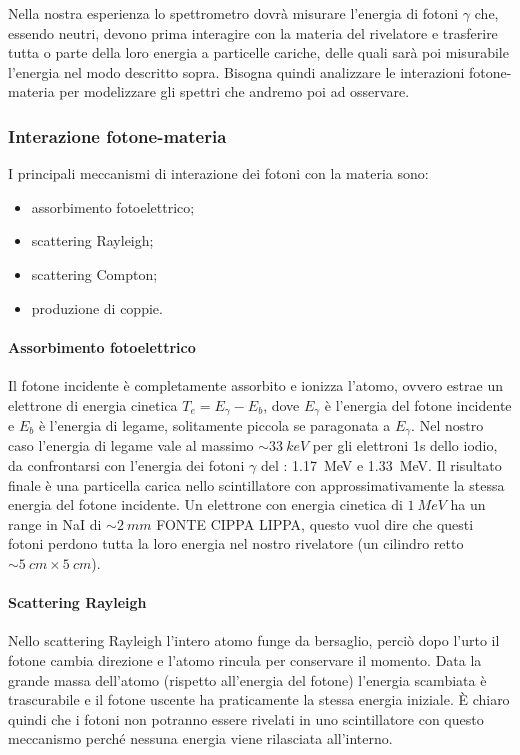 Nella nostra esperienza lo spettrometro dovrà misurare l'energia di fotoni $\gamma$ che, essendo neutri, devono prima interagire con la materia del rivelatore e trasferire tutta o parte della loro energia a particelle cariche, delle quali sarà poi misurabile l'energia nel modo descritto sopra. Bisogna quindi analizzare le interazioni fotone-materia per modelizzare gli spettri che andremo poi ad osservare.

\subsubsection{Interazione fotone-materia}
I principali meccanismi di interazione dei fotoni con la materia sono:
\begin{itemize}
	\item assorbimento fotoelettrico;
	\item scattering Rayleigh;
	\item scattering Compton;
	\item produzione di coppie.
\end{itemize}
  
 \paragraph{Assorbimento fotoelettrico}
 Il fotone incidente è completamente assorbito e ionizza l'atomo, ovvero estrae un elettrone di energia cinetica $T_e = E_{\gamma} - E_b$, dove $E_{\gamma}$ è l'energia del fotone incidente e $E_b$ è l'energia di legame, solitamente piccola se paragonata a $E_{\gamma}$. Nel nostro caso l'energia di legame vale al massimo $\sim \SI{33}{keV}$ per gli elettroni 1s dello iodio, da confrontarsi con l'energia dei fotoni $\gamma$ del \co\;: \SI{1.17}{MeV} e \SI{1.33}{MeV}. Il risultato finale è una particella carica nello scintillatore con approssimativamente la stessa energia del fotone incidente.
 Un elettrone con energia cinetica di $\SI{1}{MeV}$ ha un range in NaI di $\sim \SI{2}{mm}$ FONTE CIPPA LIPPA, questo vuol dire che questi fotoni perdono tutta la loro energia nel nostro rivelatore (un cilindro retto $\sim \SI{5}{cm} \times \SI{5}{cm}$). 

 \paragraph{Scattering Rayleigh}
 Nello scattering Rayleigh l'intero atomo funge da bersaglio, perciò dopo l'urto il fotone cambia direzione e l'atomo rincula per conservare il momento. Data la grande massa dell'atomo (rispetto all'energia del fotone) l'energia scambiata è trascurabile e il fotone uscente ha praticamente la stessa energia iniziale. \`E chiaro quindi che i fotoni non potranno essere rivelati in uno scintillatore con questo meccanismo perché nessuna energia viene rilasciata all'interno.
 
